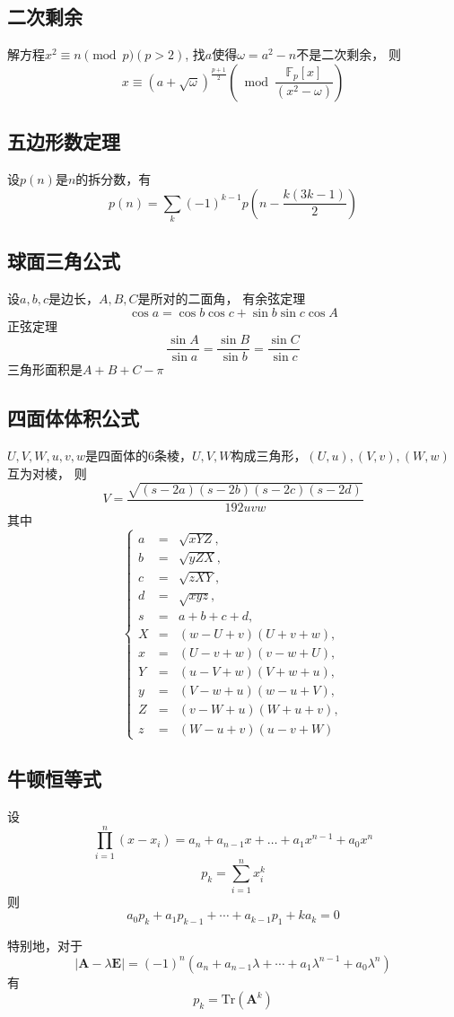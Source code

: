 \documentclass[a4paper]{article}
\begin{document}
\subsection{二次剩余}

解方程$x^2 \equiv n \pmod p (p > 2)$, 
找$a$使得$\omega = a^2 - n$不是二次剩余，
则$$x \equiv (a + \sqrt{\omega})^{\frac{p + 1}{2}} \left(\bmod \frac{\mathbb{F}_p[x]}{(x^2 - \omega)}\right)$$

\subsection{五边形数定理}

设$p(n)$是$n$的拆分数，有$$p(n) = \sum_{k} (-1)^{k - 1} p\left(n - \frac{k(3k - 1)}{2}\right)$$

\subsection{球面三角公式}

设$a, b, c$是边长，$A, B, C$是所对的二面角，
有余弦定理$$\cos a = \cos b \cos c + \sin b \sin c \cos A$$
正弦定理$$\frac{\sin A}{\sin a} = \frac{\sin B}{\sin b} = \frac{\sin C}{\sin c}$$
三角形面积是$A + B + C - \pi$


\subsection{四面体体积公式}

$U, V, W, u, v, w$是四面体的$6$条棱，$U, V, W$构成三角形，$(U, u), (V, v), (W, w)$互为对棱，
则$$V = \frac{\sqrt{(s - 2a)(s - 2b)(s - 2c)(s - 2d)}}{192 uvw}$$
其中$$\left\{\begin{array}{lll}
        a & = & \sqrt{xYZ}, \\
        b & = & \sqrt{yZX}, \\
        c & = & \sqrt{zXY}, \\
        d & = & \sqrt{xyz}, \\
        s & = & a + b + c + d, \\ 
        X & = & (w - U + v)(U + v + w), \\
        x & = & (U - v + w)(v - w + U), \\
        Y & = & (u - V + w)(V + w + u), \\
        y & = & (V - w + u)(w - u + V), \\
        Z & = & (v - W + u)(W + u + v), \\
        z & = & (W - u + v)(u - v + W)
    \end{array}\right.$$

\subsection{牛顿恒等式}

设$$\prod_{i = 1}^n{(x - x_i)} = a_n + a_{n - 1} x + \dots + a_1 x^{n - 1} + a_0 x^n$$
$$p_k = \sum_{i = 1}^n{x_i^k}$$
则$$a_0 p_k + a_1 p_{k - 1} + \cdots + a_{k - 1} p_1 + k a_k = 0$$

特别地，对于$$|\mathbf{A} - \lambda \mathbf{E}| = (-1)^n(a_n + a_{n - 1} \lambda + \cdots + a_1 \lambda^{n - 1} + a_0 \lambda^n)$$
有$$p_k = \mathrm{Tr}(\mathbf{A}^k)$$
\end{document}
